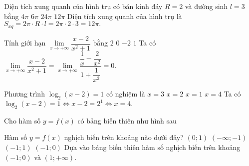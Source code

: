 \documentclass[12pt,a4paper,oneside]{book}
\begin{document}
\begin{ex}%
Diện tích xung quanh của hình trụ có bán kính đáy $ R = 2 $	và đường sinh $ l = 3 $ bằng
	\choice
	{$ 4\pi $}
	{ $ 6\pi $}
	{$ 24\pi $}
	{\True $ 12\pi $}
	\loigiai
	{Diện tích xung quanh của hình trụ là $ S_{xq}=2\pi \cdot R \cdot l = 2\pi \cdot 2 \cdot 3 = 12 \pi. $
	}
\end{ex}

\begin{ex}%
Tính giới hạn $ \lim\limits_{x \to +\infty } \dfrac{x-2}{x^2+1} $	bằng
	\choice
	{$ 2 $}
	{\True $ 0 $}
	{$ -2 $}
	{$ 1 $}
	\loigiai
	{Ta có $ \lim\limits_{x \to +\infty } \dfrac{x-2}{x^2+1} =\lim\limits_{x \to +\infty } \dfrac{\dfrac{1}{x}-\dfrac{2}{x^2}}{1+\dfrac{1}{x^2}} = 0.$
	}
\end{ex}

\begin{ex}%
Phương trình $ \log_2 (x-2)=1 $	có nghiệm là
	\choice
	{$ x=3 $}
	{$ x=2 $}
	{$ x=1 $}
	{\True $ x=4 $}
	\loigiai
	{Ta có $ \log_2 (x-2)=1 \Leftrightarrow x-2 = 2^1 \Leftrightarrow x = 4.$
	}
\end{ex}

\begin{ex}%
Cho hàm số $ y=f(x) $	có bảng biến thiên như hình sau
\begin{center}
\end{center}
Hàm số $ y=f(x) $ nghịch biến trên khoảng nào dưới đây?
	\choice
	{$ (0;1) $}
	{$ (-\infty;-1) $}
	{$ (-1;1) $}
	{\True $ (-1;0) $}
	\loigiai
	{Dựa vào bảng biến thiên hàm số nghịch biến trên khoảng $ (-1;0) $ và $ (1;+\infty) $.
	}
\end{ex}
\end{document}
